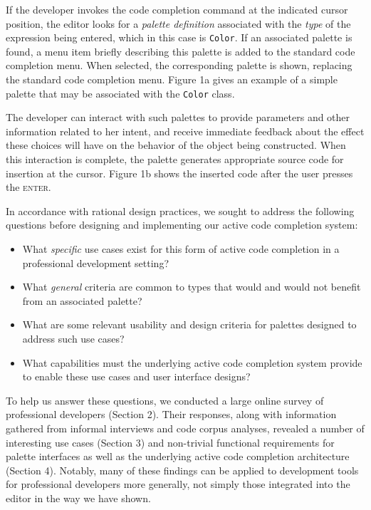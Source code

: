 \documentclass[10pt, conference, compsocconf]{IEEEtran}
\begin{document}
If the developer invokes the code completion command at the indicated cursor position, the editor  looks  for a {\it palette definition} associated with the {\it type} of the expression being entered, which in this case is  \verb|Color|. If an associated palette is found, a menu item briefly describing this palette is added to the standard code completion menu. When selected, the corresponding palette is shown, replacing the standard code completion menu. Figure 1a gives an example of a simple palette that may be associated with the \verb|Color| class. 

The developer can interact with such palettes to provide parameters and other information related to her intent, and receive immediate feedback about the effect these choices will have on the behavior of the object being constructed. When this interaction is complete, the palette generates appropriate source code for insertion at the cursor. Figure 1b shows the inserted code after the user presses the \textsc{enter}.

In accordance with rational design practices, we sought to address the following questions before designing and implementing our active code completion system:

\begin{itemize}
\item What {\it specific} use cases exist for this form of active code completion in a professional development setting? 
\item What {\it general} criteria are common to types that would and would not benefit from an associated palette?
\item What are some relevant usability and design criteria for palettes designed to address such use cases?
\item What capabilities must the underlying active code completion system provide to enable these use cases and user interface designs?
\end{itemize}

To help us answer these questions, we conducted a large online survey of professional developers (Section 2). Their responses, along with information gathered from informal interviews and code corpus analyses, revealed a number of interesting use cases (Section 3) and non-trivial functional requirements for palette interfaces as well as the underlying active code completion architecture (Section 4). Notably, many of these findings can be applied to development tools for professional developers more generally, not simply those integrated into the editor in the way we have shown.
\end{document}
